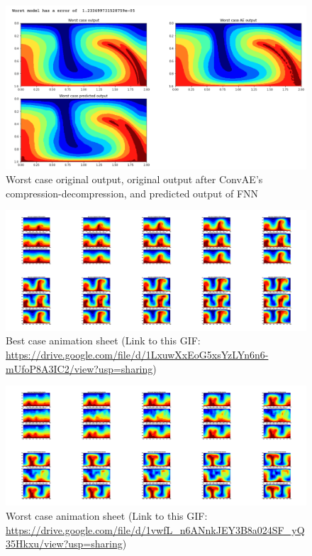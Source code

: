 \begin{figure}[H]
    \caption{Worst case original output, original output after ConvAE's compression-decompression, and predicted output of FNN}
    \includegraphics[scale=0.5]{Report LaTeX/figures/mantle_convection_images/larger_dataset/FNN_Worst.png}
\end{figure}


\begin{figure}[H]
    \centering
    \caption{Best case animation sheet (Link to this GIF: \url{https://drive.google.com/file/d/1LxuwXxEoG5xsYzLYn6n6-mUfoP8A3IC2/view?usp=sharing})}
    \includegraphics[scale=0.10]{Report LaTeX/figures/mantle_convection_images/larger_dataset/FNN_Best_GIF_sheet.png}
\end{figure}

\begin{figure}[H]
    \centering
    \caption{Worst case animation sheet (Link to this GIF: 
    \url{https://drive.google.com/file/d/1vwfL_n6ANnkJEY3B8a024SF_yQ35Hkxu/view?usp=sharing})}
    \includegraphics[scale=0.10]{Report LaTeX/figures/mantle_convection_images/larger_dataset/FNN_Worst_GIF_sheet.png}
\end{figure}


